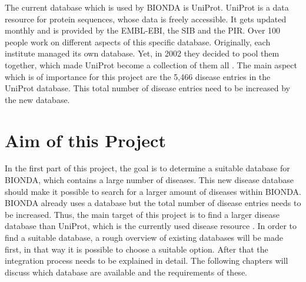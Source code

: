 The current database which is used by \ac{BIONDA} is \ac{UniProt}. \ac{UniProt} is a data resource for protein sequences, whose data is freely accessible. It gets updated monthly and is provided by the \ac{EMBL-EBI}, the \ac{SIB} and the \ac{PIR}. Over 100 people work on different aspects of this specific database. Originally, each institute managed its own database. Yet, in 2002 they decided to pool them together, which made \ac{UniProt} become a collection of them all \citep{noauthor_uniprot_nodate}. The main aspect which is of importance for this project are the 5,466 disease entries in the \ac{UniProt} database. This total number of disease entries need to be increased by the new database. 

\section{Aim of this Project}
In the first part of this project, the goal is to determine a suitable database for \ac{BIONDA}, which contains a large number of diseases. This new disease database should make it possible to search for a larger amount of diseases within \ac{BIONDA}. \ac{BIONDA} already uses a database but the total number of disease entries needs to be increased. Thus, the main target of this project is to find a larger disease database than \ac{UniProt}, which is the currently used disease resource \citep{Bionda}. In order to find a suitable database, a rough overview of existing databases will be made first, in that way it is possible to choose a suitable option. After that the integration process needs to be explained in detail. The following chapters will discuss which database are available and the requirements of these.